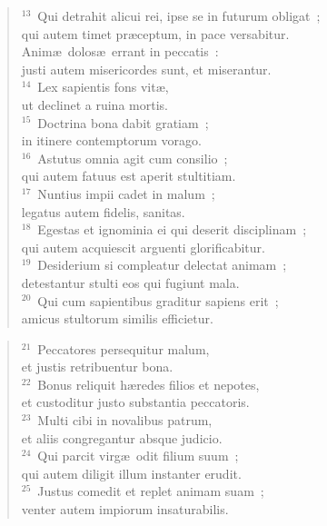 \begin{flushleft}\begin{verse}${}^{13}$~Qui detrahit alicui rei, ipse se in futurum obligat~;\\ qui autem timet pr\ae ceptum, in pace versabitur.\\ Anim\ae\ dolos\ae\ errant in peccatis~:\\ justi autem misericordes sunt, et miserantur.\\
${}^{14}$~Lex sapientis fons vit\ae ,\\ ut declinet a ruina mortis.\\
${}^{15}$~Doctrina bona dabit gratiam~;\\ in itinere contemptorum vorago.\\
${}^{16}$~Astutus omnia agit cum consilio~;\\ qui autem fatuus est aperit stultitiam.\\
${}^{17}$~Nuntius impii cadet in malum~;\\ legatus autem fidelis, sanitas.\\
${}^{18}$~Egestas et ignominia ei qui deserit disciplinam~;\\ qui autem acquiescit arguenti glorificabitur.\\
${}^{19}$~Desiderium si compleatur delectat animam~;\\ detestantur stulti eos qui fugiunt mala.\\
${}^{20}$~Qui cum sapientibus graditur sapiens erit~;\\ amicus stultorum similis efficietur.\end{verse}\end{flushleft}


\begin{flushleft}\begin{verse}${}^{21}$~Peccatores persequitur malum,\\ et justis retribuentur bona.\\
${}^{22}$~Bonus reliquit h\ae redes filios et nepotes,\\ et custoditur justo substantia peccatoris.\\
${}^{23}$~Multi cibi in novalibus patrum,\\ et aliis congregantur absque judicio.\\
${}^{24}$~Qui parcit virg\ae\ odit filium suum~;\\ qui autem diligit illum instanter erudit.\\
${}^{25}$~Justus comedit et replet animam suam~;\\ venter autem impiorum insaturabilis.\end{verse}\end{flushleft}


